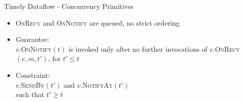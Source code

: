 \begin{frame}[t]{Timely Dataflow - Concurrency Primitives}

  \vspace{0.5cm}
  \begin{center}
  \end{center}

  \begin{itemize}
    \item \textsc{OnRecv} and \textsc{OnNotify} are queued, no strict ordering
    \vspace{0.15cm}
    \item Guarantee: \\ $v$.\textsc{OnNotify}$(t)$ is invoked only after no further invocations of
          $v$.\textsc{OnRecv}$(e,m,t')$, for $t' \leq t$
    \vspace{0.15cm}
    \item Constraint: \\ $v$.\textsc{SendBy}$(t')$ and $v$.\textsc{NotifyAt}$(t')$ \\
          such that $t' \geq t$
  \end{itemize}

\end{frame}


